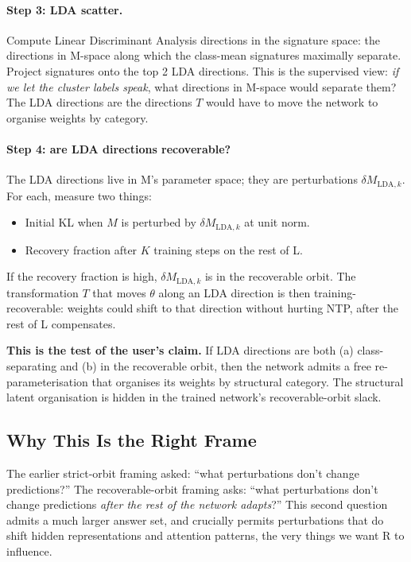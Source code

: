 \documentclass[11pt, a4paper]{article}
\theoremstyle{plain}
\theoremstyle{definition}
\theoremstyle{remark}
\begin{document}
\paragraph{Step 3: LDA scatter.}
Compute Linear Discriminant Analysis directions in the signature space: the directions in M-space along which the class-mean signatures maximally separate.
Project signatures onto the top 2 LDA directions.
This is the supervised view: \emph{if we let the cluster labels speak}, what directions in M-space would separate them?
The LDA directions are the directions $T$ would have to move the network to organise weights by category.

\paragraph{Step 4: are LDA directions recoverable?}
The LDA directions live in M's parameter space; they are perturbations $\delta M_{\text{LDA}, k}$.
For each, measure two things:
\begin{itemize}[nosep]
\item Initial KL when $M$ is perturbed by $\delta M_{\text{LDA}, k}$ at unit norm.
\item Recovery fraction after $K$ training steps on the rest of L.
\end{itemize}
If the recovery fraction is high, $\delta M_{\text{LDA}, k}$ is in the recoverable orbit.
The transformation $T$ that moves $\theta$ along an LDA direction is then training-recoverable: weights could shift to that direction without hurting NTP, after the rest of L compensates.

\textbf{This is the test of the user's claim.}
If LDA directions are both (a) class-separating and (b) in the recoverable orbit, then the network admits a free re-parameterisation that organises its weights by structural category.
The structural latent organisation is hidden in the trained network's recoverable-orbit slack.

\subsection{Why This Is the Right Frame}

The earlier strict-orbit framing asked: ``what perturbations don't change predictions?''
The recoverable-orbit framing asks: ``what perturbations don't change predictions \emph{after the rest of the network adapts}?''
This second question admits a much larger answer set, and crucially permits perturbations that do shift hidden representations and attention patterns, the very things we want R to influence.
\end{document}
